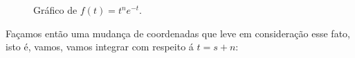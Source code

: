 \documentclass[12pt,a4paper,oneside]{book}
\theoremstyle{definition}
\theoremstyle{remark}
\numberwithin{equation}{section}
\begin{document}
\begin{figure}[h]
\centering
    
    \caption{Gráfico de $f(t)= t^ne^{-t}.$}%
    \label{fig:example}%
\end{figure}

Façamos então uma mudança de coordenadas que leve em consideração esse fato, isto é, vamos, vamos integrar com respeito á $t = s+n$:
\end{document}
